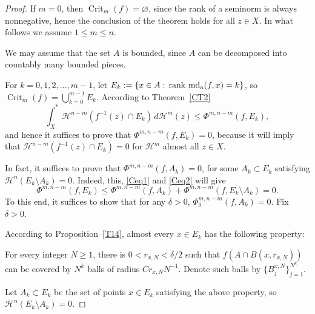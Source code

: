 \documentclass[12pt,leqno]{amsart}
\theoremstyle{definition}
\def\H{{\mathcal H}}
\def\rank{{\rm rank\,}}
\def\apmd{\operatorname{md_{\rm a}}}
\numberwithin{theorem}{section} \numberwithin{equation}{section}
\begin{document}
\begin{proof}
If $m=0$, then $\operatorname{Crit}_m(f)=\varnothing$, since the rank of a seminorm is always nonnegative, hence the conclusion of the theorem holds for all $z\in X$. In what follows we assume $1\leq m\leq n$.

We may assume that the set $A$ is bounded, since $A$ can be decomposed into countably many bounded pieces.

For $k=0,1,2,\ldots,m-1$, let
$E_k:=\{x\in A:\, \rank \apmd(f,x)=k\}$, so
$\operatorname{Crit}_m(f)=\bigcup_{k=0}^{m-1} E_k$.
According to Theorem~\ref{CT2}
$$
\int_X^*\H^{n-m}(f^{-1}(z)\cap E_k)\, d\H^m(z)\leq \Phi^{m,n-m}(f,E_k),
$$
and hence it suffices to prove that $\Phi^{m,n-m}(f,E_k)=0$, because it will imply that
$\H^{n-m}(f^{-1}(z)\cap E_k)=0$ for $\H^m$ almost all $z\in X$.

In fact, it suffices to prove that $\Phi^{m,n-m}(f,A_k)=0$, for some
$A_k\subset E_k$ satisfying $\H^n(E_k\setminus A_k)=0$. Indeed, this, \eqref{Ceq1} and \eqref{Ceq2} will give
$$
\Phi^{m,n-m}(f,E_k)\leq \Phi^{m,n-m}(f,A_k)+\Phi^{m,n-m}(f,E_k\setminus A_k)=0.
$$
To this end, it suffices to show that for any $\delta>0$, $\Phi^{m,n-m}_\delta(f,A_k)=0$.
Fix $\delta>0$.

According to Proposition~\ref{T14}, almost every $x\in E_k$ has the following property:

For every integer $N\geq 1$, there is $0<r_{x,N}<\delta/2$ such that $f(A\cap B(x,r_{x,N}))$ can be covered by $N^k$ balls of radius $Cr_{x,N}N^{-1}$. Denote such balls by $\{B_j^{x,N}\}_{j=1}^{N^k}$.

Let $A_k\subset E_k$ be the set of points $x\in E_k$ satisfying the above property, so $\H^n(E_k\setminus A_k)=0$.


\end{proof}
\end{document}
